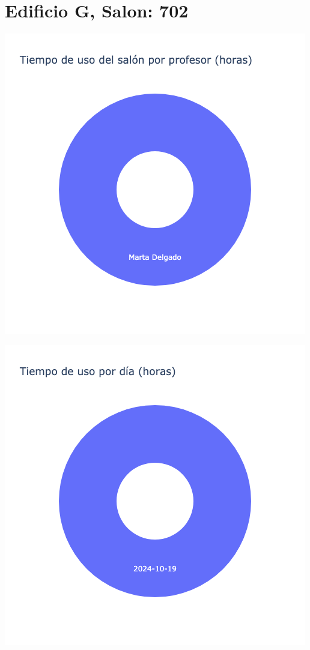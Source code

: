 \documentclass{article}
\begin{document}
    \section{Edificio G, Salon: 702}
    \noindent
    \begin{minipage}{0.48\textwidth}
        \centering
        \includegraphics[width=\textwidth]{../img/pie/UP702-90Dias-03-12-2024.png}
    \end{minipage}
    \hfill
    \begin{minipage}{0.48\textwidth}
        \centering
        \includegraphics[width=\textwidth]{../img/pie/UD702-90Dias-03-12-2024.png}
    \end{minipage}
    
\end{document}
